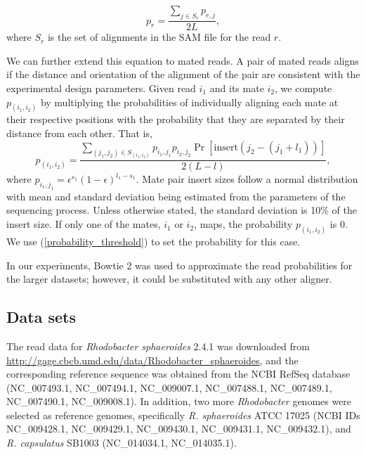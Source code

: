 \begin{equation}
\label{}
p_{r} = \frac{\sum_{j \in S_r} p_{r,j}}{2L},
\end{equation}
where $S_r$ is the set of alignments in the SAM file for the read $r$.

We can further extend this equation to mated reads.  A pair of mated
reads aligns if the distance and orientation of the alignment of the
pair are consistent with the experimental design parameters.  Given
read $i_1$ and its mate $i_2$, we compute $p_{(i_1,i_2)}$ by
multiplying the probabilities of individually aligning each mate at
their respective positions with the probability that they are
separated by their distance from each other. That is,
\begin{equation}
\label{mate_pair_prob}
p_{(i_1,i_2)} = \frac{\sum_{(j_1,j_2) \in S_{(i_1,i_2)}} p_{i_1,j_1} p_{i_2,j_2} \Pr[\textrm{insert}(j_2 - (j_1 + l_1))]}{2(L - l)},
\end{equation}
where $p_{i_1, j_1} = \epsilon^{s_1}(1 - \epsilon)^{l_1 - s_1}$.  Mate
pair insert sizes follow a normal distribution with mean and
standard deviation being estimated from the parameters of the sequencing process.  Unless otherwise stated, the standard deviation is 10\%
of the insert size.  If only one of the mates, $i_1$ or $i_2$, maps,
the probability $p_{(i_1,i_2)}$ is $0$. We use (\ref{probability_threshold}) to set the probability for this case.

In our experiments, Bowtie 2 was used to approximate the read
probabilities for the larger datasets; however, it could be substituted with any other aligner.


\subsection{Data sets}

The read data for \emph{Rhodobacter sphaeroides} 2.4.1 was downloaded from \url{
http://gage.cbcb.umd.edu/data/Rhodobacter_sphaeroides}, and the
corresponding reference sequence was obtained from the NCBI RefSeq database (NC\_007493.1, NC\_007494.1, NC\_009007.1, NC\_007488.1,
NC\_007489.1, NC\_007490.1, NC\_009008.1).
In addition, two more \emph{Rhodobacter} genomes were selected as
reference genomes, specifically \emph{R. sphaeroides} ATCC 17025 (NCBI
IDs NC\_009428.1, NC\_009429.1, NC\_009430.1, NC\_009431.1,
NC\_009432.1), and \emph{R. capsulatus} SB1003 (NC\_014034.1,
NC\_014035.1).

